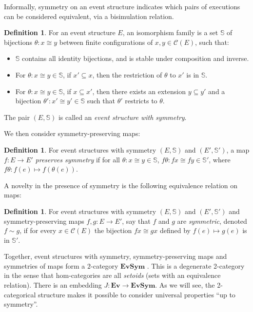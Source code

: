 \documentclass[11pt,a4paper]{article}
\theoremstyle{plain}
\theoremstyle{definition}
\newtheorem{definition}[theorem]{Definition}
\theoremstyle{remark}
\newcommand{\ES}{\mathbf{Ev}}
\newcommand{\SES}{\mathbf{EvSym}}
\newcommand{\conf}{\mathscr{C}}
\begin{document}
\label{subsec:sem-def}
 Informally, symmetry on an event structure indicates which pairs of executions can be considered equivalent, via a bisimulation relation. 
\begin{definition}
    For an event structure $E$, an isomorphism family  is a set $\mathbb{S}$ of bijections $\theta:x \cong y$ between finite configurations of $x, y \in \conf(E)$, such that:
    \begin{itemize}
        \item $\mathbb{S}$ contains all identity bijections, and is stable under composition and inverse.  
        \item For $\theta : x \cong y \in \mathbb{S}$, if $x' \subseteq x$, then the restriction of $\theta$ to $x'$ is in $\mathbb{S}$.
        \item For $\theta : x \cong y \in \mathbb{S}$, if $x \subseteq x'$, then there exists an extension $y \subseteq y'$ and a bijection $\theta' : x' \cong y' \in \mathbb{S}$ such that $\theta'$ restricts to $\theta$.
    \end{itemize}
    The pair $(E, \mathbb{S})$ is called an \emph{event structure with symmetry}.
\end{definition}

We then consider symmetry-preserving maps:
\begin{definition}
    For event structures with symmetry $(E,\mathbb{S})$ and $(E', \mathbb{S}')$, a map $f : E \rightarrow E'$ \emph{preserves symmetry} if for all $\theta : x \cong y \in \mathbb{S}$, $f \theta : fx \cong fy \in \mathbb{S}'$, where $f\theta : f(e) \mapsto f(\theta(e))$.
\end{definition}
A novelty in the presence of symmetry is the following equivalence relation on maps:
\begin{definition}
    For event structures with symmetry $(E,\mathbb{S})$ and $(E', \mathbb{S}')$ and symmetry-preserving maps $f, g : E \rightarrow E'$, say that $f$ and $g$ are \emph{symmetric}, denoted $f \sim g$, if for every $x \in \conf(E)$ the bijection $fx \cong gx$ defined by $ f(e) \mapsto g(e)$ is in $\mathbb{S}'$.
\end{definition}
Together, event structures with symmetry, symmetry-preserving maps and symmetries of maps form a $2$-category $\SES$ \cite{ESS}. This is a degenerate 2-category in the sense that hom-categories are all \emph{setoids} (sets with an equivalence relation). There is an embedding $J : \ES \to \SES$. As we will see, the 2-categorical structure makes it possible to consider universal properties ``up to symmetry''.  
\end{document}
